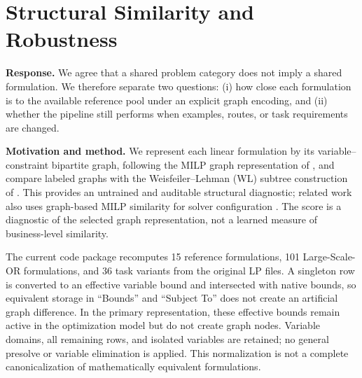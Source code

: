 \providecommand{\refdata}{\textsc{Ref-Data}}
\providecommand{\testdata}{\textsc{Large-Scale-OR}}
\newcommand{\LK}[1]{\textcolor{blue}{#1$^{\text{LK}}$}}

\section{Structural Similarity and Robustness}
\label{sec:ae-structural-similarity-compact}

\begingroup\color{replyblue}
\textbf{Response.}
We agree that a shared problem category does not imply a shared
formulation. We therefore separate two questions: (i) how close each
formulation is to the available reference pool under an explicit graph
encoding, and (ii) whether the pipeline still performs when examples,
routes, or task requirements are changed.

\medskip
\textbf{Motivation and method.}
We represent each linear formulation by its variable--constraint
bipartite graph, following the MILP graph representation of
\citet{Gasse2019}, and compare labeled graphs with the Weisfeiler--Lehman
(WL) subtree construction of \citet{Shervashidze2011}. This provides an
untrained and auditable structural diagnostic; related work also uses
graph-based MILP similarity for solver configuration
\citep{Hosny2024}. The score is a diagnostic of the selected graph
representation, not a learned measure of business-level similarity.

The current code package recomputes 15 reference formulations, 101
Large-Scale-OR formulations, and 36 task variants from the original LP
files. A singleton row is converted to an effective variable bound and
intersected with native bounds, so equivalent storage in ``Bounds'' and
``Subject To'' does not create an artificial graph difference. In the
primary representation, these effective bounds remain active in the
optimization model but do not create graph nodes. Variable domains, all
remaining rows, and isolated variables are retained; no general
presolve or variable elimination is applied. This normalization is not a
complete canonicalization of mathematically equivalent formulations.

